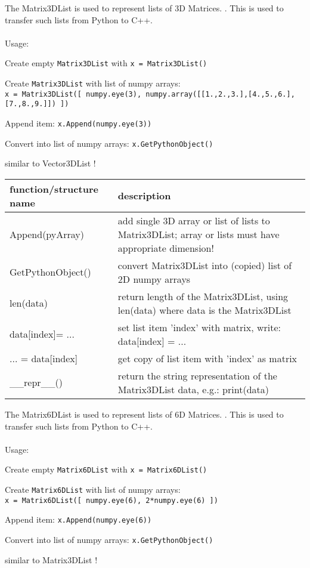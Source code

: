 The Matrix3DList is used to represent lists of 3D Matrices. . This is used to transfer such lists from Python to C++. \\ \\ Usage: \bi
  \item Create empty \texttt{Matrix3DList} with \texttt{x = Matrix3DList()} 
  \item Create \texttt{Matrix3DList} with list of numpy arrays:\\  \texttt{x = Matrix3DList([ numpy.eye(3), numpy.array([[1.,2.,3.],[4.,5.,6.],[7.,8.,9.]]) ])}
  \item Append item: \texttt{x.Append(numpy.eye(3))}
  \item Convert into list of numpy arrays: \texttt{x.GetPythonObject()}
  \item similar to Vector3DList !
\ei


\begin{center}
\footnotesize
\begin{longtable}{| p{8cm} | p{8cm} |} 
\hline
{\bf function/structure name} & {\bf description}\\ \hline
  Append(pyArray) & add single 3D array or list of lists to Matrix3DList; array or lists must have appropriate dimension!\\ \hline 
  GetPythonObject() & convert Matrix3DList into (copied) list of 2D numpy arrays\\ \hline 
  len(data) & return length of the Matrix3DList, using len(data) where data is the Matrix3DList\\ \hline 
  data[index]= ... & set list item 'index' with matrix, write: data[index] = ...\\ \hline 
  ... = data[index] & get copy of list item with 'index' as matrix\\ \hline 
  \_\_repr\_\_() & return the string representation of the Matrix3DList data, e.g.: print(data)\\ \hline 
\end{longtable}
\end{center}

The Matrix6DList is used to represent lists of 6D Matrices. . This is used to transfer such lists from Python to C++. \\ \\ Usage: \bi
  \item Create empty \texttt{Matrix6DList} with \texttt{x = Matrix6DList()} 
  \item Create \texttt{Matrix6DList} with list of numpy arrays:\\  \texttt{x = Matrix6DList([ numpy.eye(6), 2*numpy.eye(6) ])}
  \item Append item: \texttt{x.Append(numpy.eye(6))}
  \item Convert into list of numpy arrays: \texttt{x.GetPythonObject()}
  \item similar to Matrix3DList !
\ei


